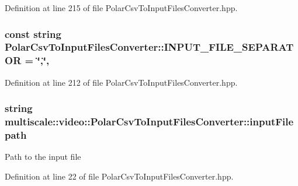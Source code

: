 Definition at line 215 of file Polar\-Csv\-To\-Input\-Files\-Converter.\-hpp.

\hypertarget{classmultiscale_1_1video_1_1PolarCsvToInputFilesConverter_a50776983508e07e012e8af56f5432791}{
\subsubsection[{I\-N\-P\-U\-T\-\_\-\-F\-I\-L\-E\-\_\-\-S\-E\-P\-A\-R\-A\-T\-O\-R}]{\setlength{\rightskip}{0pt plus 5cm}const string Polar\-Csv\-To\-Input\-Files\-Converter\-::\-I\-N\-P\-U\-T\-\_\-\-F\-I\-L\-E\-\_\-\-S\-E\-P\-A\-R\-A\-T\-O\-R = \char`\"{},\char`\"{}\hspace{0.3cm}{\ttfamily [static]}, {\ttfamily [private]}}}\label{classmultiscale_1_1video_1_1PolarCsvToInputFilesConverter_a50776983508e07e012e8af56f5432791}


Definition at line 212 of file Polar\-Csv\-To\-Input\-Files\-Converter.\-hpp.

\hypertarget{classmultiscale_1_1video_1_1PolarCsvToInputFilesConverter_a7b33b6d00b5e0d809f4fb0d76985ab59}{
\subsubsection[{input\-Filepath}]{\setlength{\rightskip}{0pt plus 5cm}string multiscale\-::video\-::\-Polar\-Csv\-To\-Input\-Files\-Converter\-::input\-Filepath\hspace{0.3cm}{\ttfamily [private]}}}\label{classmultiscale_1_1video_1_1PolarCsvToInputFilesConverter_a7b33b6d00b5e0d809f4fb0d76985ab59}
Path to the input file 

Definition at line 22 of file Polar\-Csv\-To\-Input\-Files\-Converter.\-hpp.

